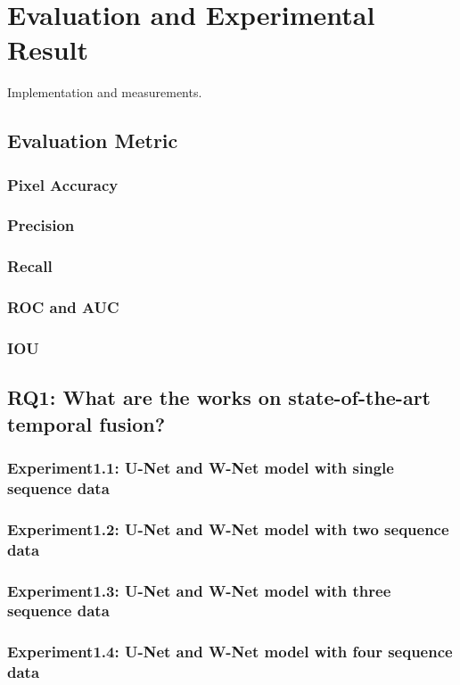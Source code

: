 

    \chapter{Evaluation and Experimental Result}
	\label{chap:evaluationandresult}
    Implementation and measurements.
    
    \section{Evaluation Metric}
    \subsection{Pixel Accuracy}
    \subsection{Precision}
    \subsection{Recall}
    \subsection{ROC and AUC}
    \subsection{IOU}
    \section{RQ1: What are the works on state-of-the-art temporal fusion?}
    \subsection{Experiment1.1: U-Net and W-Net model with single sequence data}
    \subsection{Experiment1.2: U-Net and W-Net model with two sequence data}
    \subsection{Experiment1.3: U-Net and W-Net model with three sequence data}
    \subsection{Experiment1.4: U-Net and W-Net model with four sequence data}
